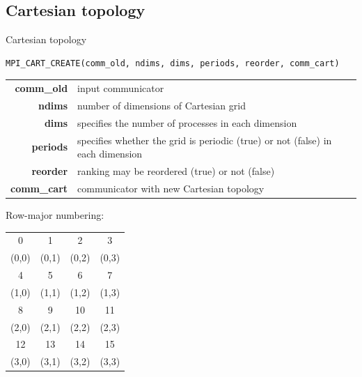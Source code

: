 \documentclass[aspectratio=43]{beamer}
\begin{document}
\subsection{Cartesian topology}
\begin{frame}[fragile]{Cartesian topology}
\footnotesize
\begin{verbatim}
MPI_CART_CREATE(comm_old, ndims, dims, periods, reorder, comm_cart)
\end{verbatim}
\vspace{-0.2cm}
\begin{black1block}{}
\begin{tabular}{rp{8cm}}
\textbf{comm\_old} & input communicator\\
\textbf{ndims} & number of dimensions of Cartesian grid\\
\textbf{dims} & specifies the number of processes in each dimension\\
\textbf{periods} & specifies whether the grid is periodic (true) or not (false) in each dimension\\
\textbf{reorder} & ranking may be reordered (true) or not (false)\\
\textbf{comm\_cart} & communicator with new Cartesian topology\\
\end{tabular}
\end{black1block}
\vspace{-0.3cm}
\begin{center}
Row-major numbering:\hspace{0.5cm}
\begin{tabular}{|c|c|c|c|}
\hline
\color{cscsblue}0  & \color{cscsblue}1  & \color{cscsblue}2  & \color{cscsblue}3\\
    (0,0) & (0,1) & (0,2) & (0,3)\\\hline
\color{cscsblue}4  & \color{cscsblue}5  & \color{cscsblue}6  & \color{cscsblue}7\\
    (1,0) & (1,1) & (1,2) & (1,3)\\\hline
\color{cscsblue}8  & \color{cscsblue}9  & \color{cscsblue}10 & \color{cscsblue}11\\
    (2,0) & (2,1) & (2,2) & (2,3)\\\hline
\color{cscsblue}12 & \color{cscsblue}13 & \color{cscsblue}14 & \color{cscsblue}15\\
    (3,0) & (3,1) & (3,2) & (3,3)\\\hline
\end{tabular}
\end{center}
\end{frame}
\end{document}
